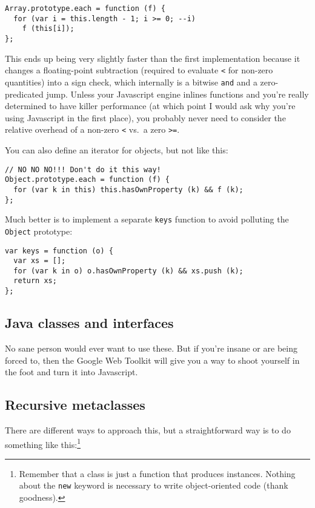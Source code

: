 \documentclass{article}
\begin{document}
\begin{verbatim}
Array.prototype.each = function (f) {
  for (var i = this.length - 1; i >= 0; --i)
    f (this[i]);
};
\end{verbatim}

    This ends up being very slightly faster than the first implementation because it changes a floating-point subtraction (required to evaluate \verb|<| for non-zero quantities) into a sign
    check, which internally is a bitwise \verb|and| and a zero-predicated jump. Unless your Javascript engine inlines functions and you're really determined to have killer performance (at
    which point I would ask why you're using Javascript in the first place), you probably never need to consider the relative overhead of a non-zero \verb|<| vs.~a zero \verb|>=|.

    You can also define an iterator for objects, but not like this:

\begin{verbatim}
// NO NO NO!!! Don't do it this way!
Object.prototype.each = function (f) {
  for (var k in this) this.hasOwnProperty (k) && f (k);
};
\end{verbatim}

    Much better is to implement a separate \verb|keys| function to avoid polluting the \verb|Object| prototype:

\begin{verbatim}
var keys = function (o) {
  var xs = [];
  for (var k in o) o.hasOwnProperty (k) && xs.push (k);
  return xs;
};
\end{verbatim}

\subsection {Java classes and interfaces}
    No sane person would ever want to use these. But if you're insane or are being forced to, then the Google Web Toolkit will give you a way to shoot yourself in the foot and turn it into
    Javascript.

\subsection {Recursive metaclasses}
    There are different ways to approach this, but a straightforward way is to do something like this:\footnote{Remember that a class is just a function that produces instances. Nothing about
    the {\tt new} keyword is necessary to write object-oriented code (thank goodness).}
\end{document}

